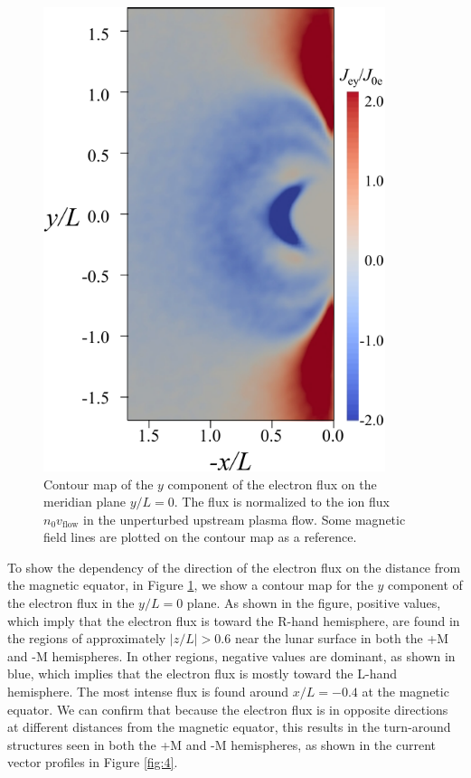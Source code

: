 \documentclass[draft,jgrga]{agutex2015}
\begin{document}
\begin{article}
\begin{figure}[h]
\centering
\noindent\includegraphics[width=10cm]{./figures/Fig_7_bb-crop.pdf}
\caption{
Contour map of the $y$ component of the electron flux 
on the meridian plane $y/L=0$.
The flux is normalized to the ion flux $n_\mathrm{0}v_\mathrm{flow}$
in the unperturbed upstream plasma flow.
Some magnetic field lines are plotted on the contour map as a reference.
}
\label{fig:7} 
\end{figure}

To show the dependency of the direction of the electron flux on the distance
from the magnetic equator, in Figure \ref{fig:7},
we show a contour map for the $y$ component of the electron flux 
in the $y/L=0$ plane.
As shown in the figure, 
positive values, which imply that the electron flux is toward the R-hand hemisphere,
are found in the regions of approximately $|z/L| > 0.6$ near the lunar surface
in both the +M and -M hemispheres.
In other regions, 
negative values are dominant, as shown in blue, 
which implies that the electron flux is mostly toward the L-hand hemisphere. 
The most intense flux is found 
around $x/L=-0.4$ at the magnetic equator.
We can confirm that because the electron flux is in opposite directions 
at different distances from the magnetic equator, this results in the 
turn-around structures seen in both the +M and -M hemispheres, 
as shown in the current vector profiles in Figure \ref{fig:4}.



\end{article}
\end{document}
